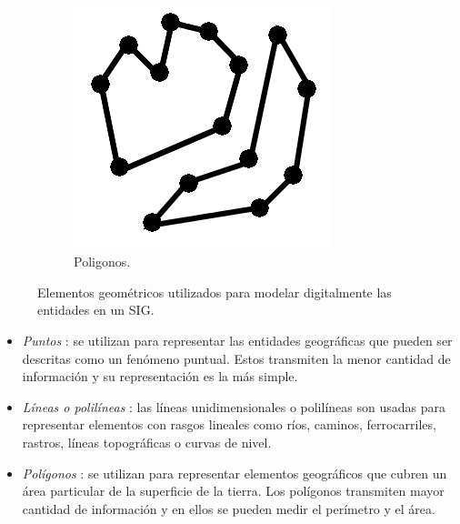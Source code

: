 \begin{figure}[!htbp]
\begin{subfigure}[b]{0.3\textwidth}
    \end{subfigure}
    ~~~~
    \begin{subfigure}[b]{0.3\textwidth}
            \includegraphics[width=\textwidth]{capitulo-2/graphics/datos-poligonales.png}
            \caption{Poligonos.}

    \end{subfigure}
    \caption{\label{fig:sig-xyz} Elementos geométricos utilizados para modelar digitalmente las entidades en un SIG.}
\end{figure}

\begin{itemize}
    \item \textit{Puntos} : se utilizan para representar las entidades geográficas que pueden ser
    descritas como un fenómeno puntual. Estos transmiten la menor cantidad de información y su representación es la más simple.

    \item \textit{Líneas o polilíneas} : las líneas unidimensionales o polilíneas son usadas para
    representar elementos con rasgos lineales como ríos, caminos, ferrocarriles, rastros, líneas
    topográficas o curvas de nivel.

    \item \textit{Polígonos} : se utilizan para representar elementos geográficos que cubren un
    área particular de la superficie de la tierra. Los polígonos transmiten mayor cantidad de
    información y en ellos se pueden medir el perímetro y el área.
\end{itemize}

